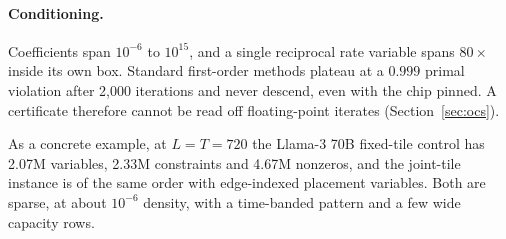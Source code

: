 \paragraph{Conditioning.} Coefficients span $10^{-6}$ to $10^{15}$, and a single
reciprocal rate variable spans $80\times$ inside its own box.
Standard first-order methods plateau at a $0.999$ primal violation after 2,000 iterations and never descend, even with the chip pinned.
A certificate therefore cannot be read off floating-point iterates (Section~\ref{sec:ocs}).

As a concrete example, at $L=T=720$ the Llama-3 70B fixed-tile control has 2.07M variables, 2.33M constraints and 4.67M nonzeros, and the joint-tile instance is of the same order with edge-indexed placement variables.
Both are sparse, at about $10^{-6}$ density, with a time-banded pattern and a few wide capacity rows.
